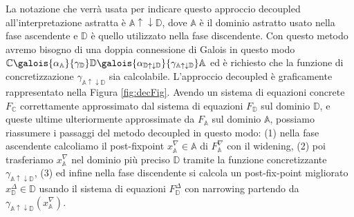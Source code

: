 La notazione che verrà usata per indicare questo approccio decoupled all'interpretazione astratta è \(\mathbb{A}\uparrow\downarrow\mathbb{D}\), dove \(\mathbb{A}\) è il dominio astratto usato nella fase ascendente e \(\mathbb{D}\) è quello utilizzato nella fase discendente. Con questo metodo avremo bisogno di una doppia connessione di Galois in questo modo \(\mathbb{C}\galois{\alpha_{\mathbb{A}}}{\gamma_{\mathbb{D}}}\mathbb{D}\galois{\alpha_{\mathbb{D}\uparrow\downarrow\mathbb{D}}}{\gamma_{\mathbb{A}\uparrow\downarrow\mathbb{D}}}\mathbb{A}\) ed è richiesto che la funzione di concretizzazione \(\gamma_{\mathbb{A}\uparrow\downarrow\mathbb{D}}\) sia calcolabile. L'approccio decoupled è graficamente rappresentato nella Figura \ref{fig:decFig}. Avendo un sistema di equazioni concrete \(F_{\mathbb{C}}\) correttamente approssimato dal sistema di equazioni \(F_{\mathbb{D}}\) sul dominio \(\mathbb{D}\), e queste ultime ulteriormente approssimate da \(F_{\mathbb{A}}\) sul dominio \(\mathbb{A}\), possiamo riassumere i passaggi del metodo decoupled in questo modo: (1) nella fase ascendente calcoliamo il post-fixpoint \(x^{\nabla}_{\mathbb{A}}\in\mathbb{A}\) di \(F^{\nabla}_{\mathbb{A}}\) con il widening, (2) poi trasferiamo \(x^{\nabla}_{\mathbb{A}}\) nel dominio più preciso \(\mathbb{D}\) tramite la funzione concretizzante \(\gamma_{\mathbb{A}\uparrow\downarrow\mathbb{D}}\), (3) ed infine nella fase discendente si calcola un post-fix-point migliorato \(x^{\Delta}_{\mathbb{D}}\in\mathbb{D}\) usando il sistema di equazioni \(F^{\Delta}_{\mathbb{D}}\) con narrowing partendo da  \(\gamma_{\mathbb{A}\uparrow\downarrow\mathbb{D}}(x^{\nabla}_{\mathbb{A}})\).

